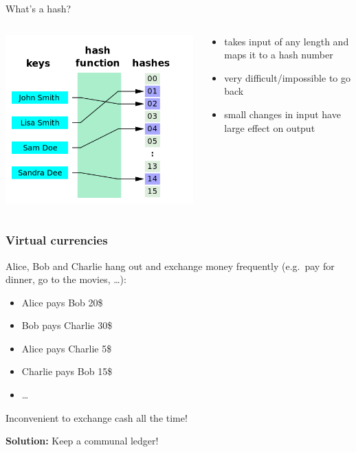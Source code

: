 \documentclass[12pt]{beamer}
\theoremstyle{definition}
\numberwithin{equation}{section}
\begin{document}
\begin{frame}{What's a hash?}
  \begin{columns}
    \begin{column}{.5\textwidth}
    \includegraphics[width=\textwidth]{hash_wikipedia}
    \end{column}
    \begin{column}{.5\textwidth}
      \begin{itemize}
      \item takes input of any length and maps it to a hash number
      \item very difficult/impossible to go back
      \item small changes in input have large effect on output
      \end{itemize}
    \end{column}
    \end{columns}
  \end{frame}


\begin{frame}
\frametitle{Virtual currencies}
Alice, Bob and Charlie hang out and exchange money frequently (e.g.~pay for dinner, go to the movies, \ldots):
\begin{itemize}
\item Alice pays Bob 20\$
\item Bob pays Charlie 30\$
\item Alice pays Charlie 5\$
\item Charlie pays Bob 15\$
\item \ldots
\end{itemize}
Inconvenient to exchange cash all the time!

\medskip

\textbf{Solution:} Keep a communal ledger!
\end{frame}
\end{document}
